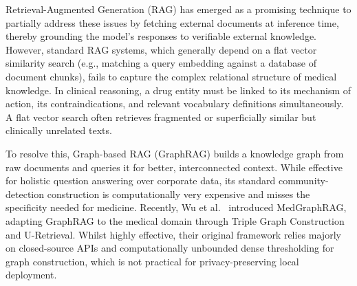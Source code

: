 \documentclass[a4paper,fleqn]{cas-sc}
\begin{document}
Retrieval-Augmented Generation (RAG) \cite{lewis2021rag} has emerged as a promising technique to partially address these issues by fetching external documents at inference time, thereby grounding the model's responses to verifiable external knowledge. However, standard RAG systems, which generally depend on a flat vector similarity search (e.g., matching a query embedding against a database of document chunks), fails to capture the complex relational structure of medical knowledge. In clinical reasoning, a drug entity must be linked to its mechanism of action, its contraindications, and relevant vocabulary definitions simultaneously. A flat vector search often retrieves fragmented or superficially similar but clinically unrelated texts.

To resolve this, Graph-based RAG (GraphRAG) \cite{edge2024graphrag} builds a knowledge graph from raw documents and queries it for better, interconnected context. While effective for holistic question answering over corporate data, its standard community-detection construction is computationally very expensive and misses the specificity needed for medicine. Recently, Wu et al.\ \cite{wu2024medgraphrag} introduced MedGraphRAG, adapting GraphRAG to the medical domain through Triple Graph Construction and U-Retrieval. Whilst highly effective, their original framework relies majorly on closed-source APIs and computationally unbounded dense thresholding for graph construction, which is not practical for privacy-preserving local deployment.
\end{document}
